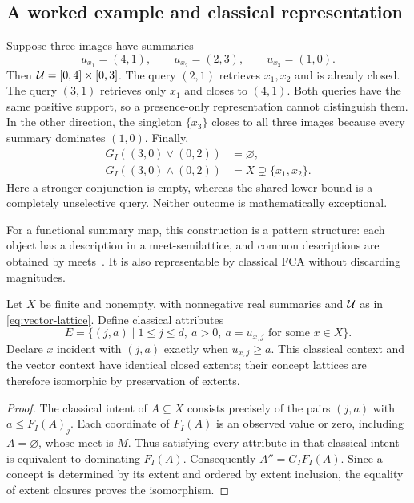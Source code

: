 \subsection{A worked example and classical representation}
\label{sub:example-scaling}
Suppose three images have summaries
\begin{equation}\label{eq:worked-summaries}
      u_{x_{1}}=(4,1),\qquad u_{x_{2}}=(2,3),\qquad u_{x_{3}}=(1,0).
\end{equation}
Then $\mathcal{U}=[0,4]\times[0,3]$. The query $(2,1)$ retrieves $x_{1},x_{2}$
and is already closed. The query $(3,1)$ retrieves only $x_{1}$ and
closes to $(4,1)$. Both queries have the same positive support, so a
presence-only representation cannot distinguish them. In the other
direction, the singleton $\{x_{3}\}$ closes to all three images because
every summary dominates $(1,0)$. Finally,
\begin{equation}\label{eq:worked-meet-join}
      \begin{aligned}
            G_{I}((3,0)\vee(0,2))   & =\varnothing, \\
            G_{I}((3,0)\wedge(0,2)) & =X
            \supsetneq\{x_{1},x_{2}\}.
      \end{aligned}
\end{equation}
Here a stronger conjunction is empty, whereas the shared lower bound
is a completely unselective query. Neither outcome is mathematically
exceptional.

For a functional summary map, this construction is a pattern structure:
each object has a description in a meet-semilattice, and common
descriptions are obtained by meets~\cite{ganter2001pattern}. It is also
representable by classical FCA without discarding magnitudes.

\begin{proposition}
      \label{prop:ordinal-scaling}
      Let $X$ be finite and nonempty, with nonnegative real summaries and $\mathcal{U}$
      as in \cref{eq:vector-lattice}. Define classical attributes
      \begin{equation}\label{eq:ordinal-attributes}
            E=\{(j,a)\mid 1\leq j\leq d,\ a>0,
            \ a=u_{x,j}\text{ for some }x\in X\}.
      \end{equation}
      Declare $x$ incident with $(j,a)$ exactly when $u_{x,j}\geq a$. This
      classical context and the vector context have identical closed extents;
      their concept lattices are therefore isomorphic by preservation of
      extents.
\end{proposition}
\begin{proof}
      The classical intent of $A\subseteq X$ consists precisely of the pairs
      $(j,a)$ with $a\leq F_{I}(A)_{j}$. Each coordinate of $F_{I}(A)$ is an
      observed value or zero, including $A=\varnothing$, whose meet is $M$.
      Thus satisfying every attribute in that classical intent is equivalent
      to dominating $F_{I}(A)$. Consequently $A''=G_{I}F_{I}(A)$. Since a
      concept is determined by its extent and ordered by extent inclusion,
      the equality of extent closures proves the isomorphism.
\end{proof}

